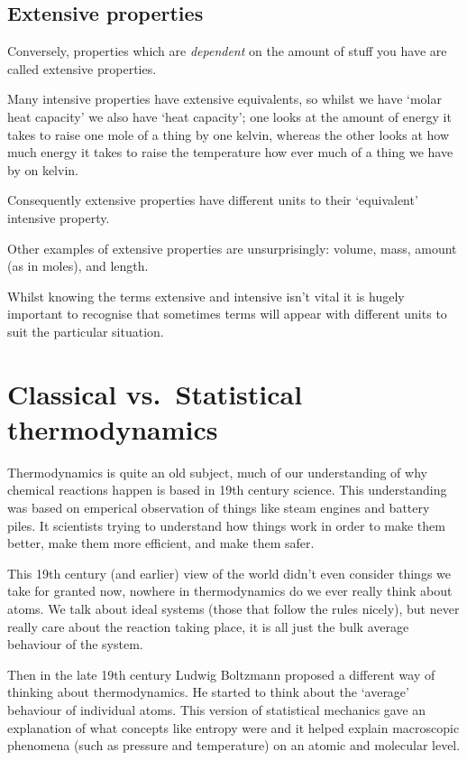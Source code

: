 \documentclass[
]{book}
\begin{document}
\hypertarget{sec:extensive}{%
\subsection{Extensive properties}\label{sec:extensive}}

Conversely, properties which are \emph{dependent} on the amount of stuff you have are called extensive properties.

Many intensive properties have extensive equivalents, so whilst we have `molar heat capacity' we also have `heat capacity'; one looks at the amount of energy it takes to raise one mole of a thing by one kelvin, whereas the other looks at how much energy it takes to raise the temperature how ever much of a thing we have by on kelvin.

Consequently extensive properties have different units to their `equivalent' intensive property.

Other examples of extensive properties are unsurprisingly: volume, mass, amount (as in moles), and length.

Whilst knowing the terms extensive and intensive isn't vital it is hugely important to recognise that sometimes terms will appear with different units to suit the particular situation.

\hypertarget{sec:classicalstat}{%
\section{Classical vs.~Statistical thermodynamics}\label{sec:classicalstat}}

Thermodynamics is quite an old subject, much of our understanding of why chemical reactions happen is based in 19th century science. This understanding was based on emperical observation of things like steam engines and battery piles. It scientists trying to understand how things work in order to make them better, make them more efficient, and make them safer.

This 19th century (and earlier) view of the world didn't even consider things we take for granted now, nowhere in thermodynamics do we ever really think about atoms. We talk about ideal systems (those that follow the rules nicely), but never really care about the reaction taking place, it is all just the bulk average behaviour of the system.

Then in the late 19th century Ludwig Boltzmann proposed a different way of thinking about thermodynamics. He started to think about the `average' behaviour of individual atoms. This version of statistical mechanics gave an explanation of what concepts like entropy were and it helped explain macroscopic phenomena (such as pressure and temperature) on an atomic and molecular level.
\end{document}
